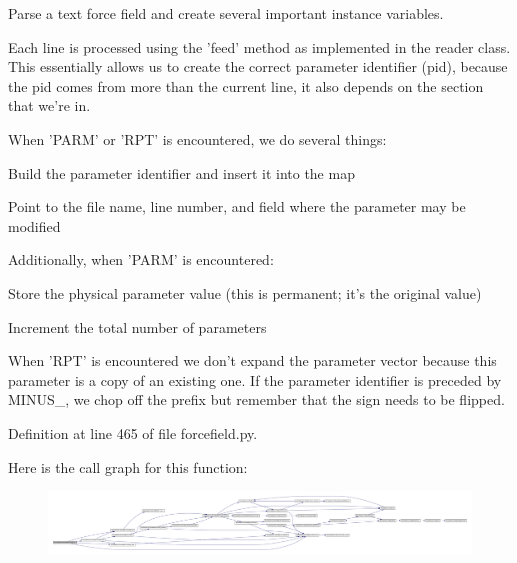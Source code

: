 \-Parse a text force field and create several important instance variables. 

\-Each line is processed using the 'feed' method as implemented in the reader class. \-This essentially allows us to create the correct parameter identifier (pid), because the pid comes from more than the current line, it also depends on the section that we're in.

\-When '\-P\-A\-R\-M' or '\-R\-P\-T' is encountered, we do several things\-:
\begin{DoxyItemize}
\item \-Build the parameter identifier and insert it into the map
\item \-Point to the file name, line number, and field where the parameter may be modified
\end{DoxyItemize}

\-Additionally, when '\-P\-A\-R\-M' is encountered\-:
\begin{DoxyItemize}
\item \-Store the physical parameter value (this is permanent; it's the original value)
\item \-Increment the total number of parameters
\end{DoxyItemize}

\-When '\-R\-P\-T' is encountered we don't expand the parameter vector because this parameter is a copy of an existing one. \-If the parameter identifier is preceded by \-M\-I\-N\-U\-S\-\_\-, we chop off the prefix but remember that the sign needs to be flipped. 

\-Definition at line 465 of file forcefield.\-py.



\-Here is the call graph for this function\-:
\nopagebreak
\begin{figure}[H]
\begin{center}
\leavevmode
\includegraphics[width=350pt]{classforcebalance_1_1forcefield_1_1FF_ab4b5d5b79c89ab618ae968348bdfda3a_cgraph}
\end{center}
\end{figure}


